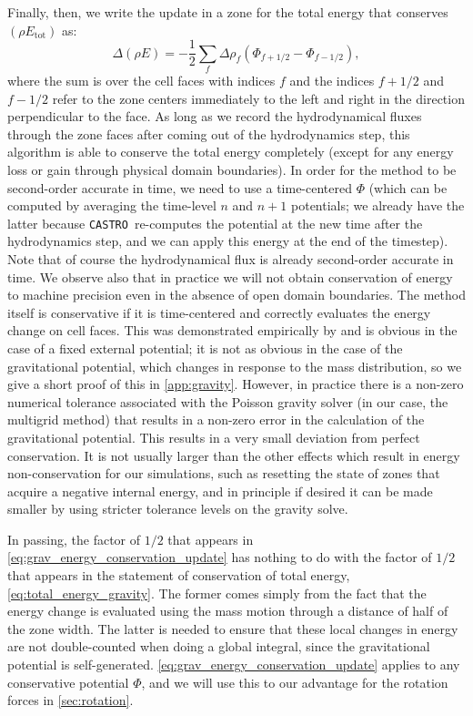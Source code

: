 \documentclass[iop]{../emulateapj}
\newcommand{\castro}{\texttt{CASTRO}}
\begin{document}
Finally, then, we write the update in a zone for the total energy that conserves $(\rho E_{\text{tot}})$ as:
\begin{equation}
  \Delta (\rho E) = -\frac{1}{2}\sum_{f} \Delta \rho_{f} (\Phi_{f+1/2} - \Phi_{f-1/2}),\label{eq:grav_energy_conservation_update}
\end{equation}
where the sum is over the cell faces with indices $f$ and the indices $f+1/2$ and $f-1/2$ refer to 
the zone centers immediately to the left and right in the direction perpendicular to the face.
As long as we record the hydrodynamical fluxes through the zone faces after coming out of the hydrodynamics step, 
this algorithm is able to conserve the total energy completely (except for any energy loss or gain through 
physical domain boundaries). In order for the method to be second-order accurate in time, 
we need to use a time-centered $\Phi$ (which can be computed by averaging the time-level $n$ and $n+1$ potentials;
we already have the latter because \castro\ re-computes the potential at the new time after the hydrodynamics step,
and we can apply this energy at the end of the timestep). Note that of course the hydrodynamical
flux is already second-order accurate in time. We observe also that in practice we will not obtain 
conservation of energy to machine precision even in the absence of open domain boundaries. The 
method itself is conservative if it is time-centered and correctly evaluates the energy change 
on cell faces. This was demonstrated empirically by \cite{jiang:2013} and is obvious in the case of a
fixed external potential; it is not as obvious in the case of the gravitational potential, which
changes in response to the mass distribution, so we give a short proof of this in \autoref{app:gravity}.
However, in practice there is a non-zero numerical tolerance associated 
with the Poisson gravity solver (in our case, the multigrid method) that results in a non-zero error 
in the calculation of the gravitational potential. This results in a very small deviation from perfect 
conservation. It is not usually larger than the other effects which result in energy non-conservation 
for our simulations, such as resetting the state of zones that acquire a negative internal energy, and 
in principle if desired it can be made smaller by using stricter tolerance levels on the gravity solve.

In passing, the factor of $1/2$ that appears in \autoref{eq:grav_energy_conservation_update} 
has nothing to do with the factor of $1/2$ that appears in the statement of conservation of total energy, 
\autoref{eq:total_energy_gravity}. The former comes simply from the fact that the energy change is 
evaluated using the mass motion through a distance of half of the zone width. The latter is needed 
to ensure that these local changes in energy are not double-counted when doing a global integral, 
since the gravitational potential is self-generated. \autoref{eq:grav_energy_conservation_update} 
applies to any conservative potential $\Phi$, and we will use this to our advantage for the 
rotation forces in \autoref{sec:rotation}.
\end{document}
